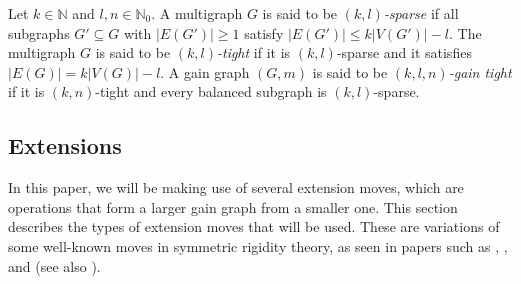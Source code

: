 \documentclass[reqno,a4paper,10pt]{article}
\theoremstyle{definition}
\theoremstyle{remark}
\numberwithin{equation}{section}
\numberwithin{figure}{section}
\numberwithin{table}{section}
\newcommand{\N}{\mathbb{N}}
\begin{document}
        Let $k\in\N$ and $l,n\in\N_0$. A multigraph $G$ is said to be \emph{$(k,l)$-sparse} if all subgraphs $G'\subseteq G$ with $|E(G')|\geq1$ satisfy $|E(G')|\leq k|V(G')|-l$. The multigraph $G$ is said to be \emph{$(k,l)$-tight} if it is $(k,l)$-sparse and it satisfies $|E(G)|=k|V(G)|-l$. A gain graph $(G,m)$ is said to be \emph{$(k,l,n)$-gain tight} if it is $(k,n)$-tight and every balanced subgraph is $(k,l)$-sparse.

 

    \subsection{Extensions}\label{SectionExtensions}
  In this paper, we will be making use of several extension moves, which are operations that form a larger gain graph from a smaller one. This section describes the types of extension moves that will be used. These are variations of some well-known moves in symmetric rigidity theory, as seen in papers such as \cite{EGRES}, \cite{KitsonSymmetricNormed}, \cite{GridLike} and \cite{Inductive} (see also \cite{Quotient}).
  
\end{document}
